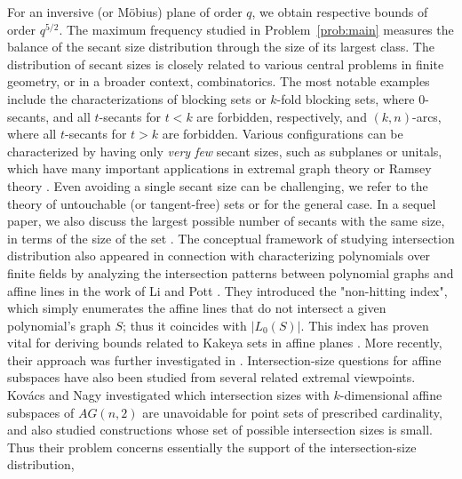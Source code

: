 \documentclass[10pt]{article}
\theoremstyle{definition}
\newcommand{\zsst}[1]{%
	\bgroup
	\markoverwith{\textcolor{magenta}{\rule[0.5ex]{2pt}{1.2pt}}}%
	\ULon{#1}%
	\egroup
}
\begin{document}
	
	For an inversive (or Möbius) plane of order \(q\), we obtain respective  bounds of order \(q^{5/2}\).
	{The maximum frequency studied in Problem~\ref{prob:main} measures the
		balance of the secant size distribution through the size of its largest
		class.}
	The distribution of secant sizes is closely related to various central problems in finite geometry, or in a broader context, combinatorics. The most notable examples include the characterizations of blocking sets or $k$-fold blocking sets, where $0$-secants, and all $t$-secants for $t<k$ are forbidden, respectively, and  $(k, n)$-arcs, where   all $t$-secants for $t>k$ are forbidden. Various  configurations can be characterized by having only \textit{very few} secant sizes, such as subplanes or unitals, which have many important applications in extremal graph theory or Ramsey theory \cite{Mubayi-Vers, Sam-Vers}. Even avoiding a single secant size can be challenging, we refer to the theory of untouchable (or tangent-free) sets \cite{Blokhuis, BSzW} or \cite{Heger-Nagy} for the general case. In a sequel paper, we also discuss the largest possible number of secants with the same size, in terms of the size of the set \cite{ZsZ2}. 
	The conceptual framework of studying intersection distribution also appeared in connection with characterizing polynomials over finite fields by analyzing the intersection patterns between polynomial graphs and affine lines in the work of Li and Pott \cite{Li-Pott}. They introduced the  "non-hitting index", which simply enumerates the affine lines that do not intersect a given polynomial's graph $S$; thus it coincides with $|L_0(S)|$. This index has proven vital for  deriving bounds related to  Kakeya sets in affine planes \cite{Li-Pott}. More recently, their approach was further investigated in \cite{Huczynska}.
	Intersection-size questions for affine subspaces have also been studied
	from several related extremal viewpoints.  Kov\'acs and Nagy
	\cite{KovacsNagy25} investigated which intersection sizes with
	\(k\)-dimensional affine subspaces of \(AG(n,2)\) are unavoidable for
	point sets of prescribed cardinality, and also studied constructions
	whose set of possible intersection sizes is small.  Thus their problem
	concerns essentially the support of the intersection-size distribution,
\end{document}

